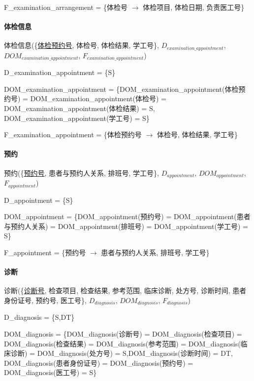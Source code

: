 \documentclass{article}
\begin{document}
F\_examination\_arrangement = \{体检号 $\rightarrow$ 体检项目, 体检日期, 负责医工号\}

\paragraph{体检信息}

体检信息(\{\underline{体检预约号}, 体检号, 体检结果, 学工号\}, $D_{examination\_appointment}$, \newline $DOM_{examination\_appointment}$, $F_{examination\_appointment}$)

D\_examination\_appointment = \{S\}

DOM\_examination\_appointment = \{DOM\_examination\_appointment(体检预约号) = \newline DOM\_examination\_appointment(体检号) = \newline DOM\_examination\_appointment(体检结果) = S, DOM\_examination\_appointment(学工号) = S\}

F\_examination\_appointment = \{体检预约号 $\rightarrow$ 体检号, 体检结果, 学工号\}

\paragraph{预约}

预约(\{\underline{预约号}, 患者与预约人关系, 排班号, 学工号\}, $D_{appointment}$, $DOM_{appointment}$, $F_{appointment}$)

D\_appointment = \{S\}

DOM\_appointment = \{DOM\_appointment(预约号) = DOM\_appointment(患者与预约人关系) = \newline DOM\_appointment(排班号) = DOM\_appointment(学工号) = S\}

F\_appointment = \{预约号 $\rightarrow$ 患者与预约人关系, 排班号, 学工号\}

\paragraph{诊断}

诊断(\{\underline{诊断号}, 检查项目, 检查结果, 参考范围, 临床诊断, 处方号, 诊断时间, 患者身份证号, 预约号, 医工号\}, $D_{diagnosis}$, $DOM_{diagnosis}$, $F_{diagnosis}$)

D\_diagnosis = \{S,DT\}

DOM\_diagnosis = \{DOM\_diagnosis(诊断号) = DOM\_diagnosis(检查项目) = DOM\_diagnosis(检查结果) = DOM\_diagnosis(参考范围) = DOM\_diagnosis(临床诊断) = DOM\_diagnosis(处方号) = S,\newline DOM\_diagnosis(诊断时间) = DT, DOM\_diagnosis(患者身份证号) = DOM\_diagnosis(预约号) = \newline DOM\_diagnosis(医工号) = S\}
\end{document}
